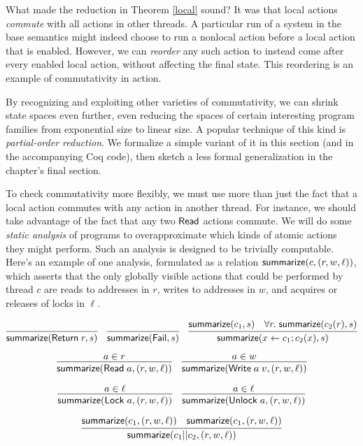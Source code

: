 \documentclass{amsbook}
\theoremstyle{definition}
\theoremstyle{remark}
\numberwithin{section}{chapter}
\numberwithin{equation}{chapter}
\begin{document}
What made the reduction in Theorem \ref{local} sound?
It was that local actions \emph{commute} with all actions in other threads.
A particular run of a system in the base semantics might indeed choose to run a nonlocal action before a local action that is enabled.
However, we can \emph{reorder} any such action to instead come after every enabled local action, without affecting the final state.
This reordering is an example of commutativity in action.

By recognizing and exploiting other varieties of commutativity, we can shrink state spaces even further, even reducing the spaces of certain interesting program families from exponential size to linear size.
A popular technique of this kind is \emph{partial-order reduction}.
We formalize a simple variant of it in this section (and in the accompanying Coq code), then sketch a less formal generalization in the chapter's final section.

\newcommand{\summ}[2]{\mt{summarize}(#1, #2)}

To check commutativity more flexibly, we must use more than just the fact that a local action commutes with any action in another thread.
For instance, we should take advantage of the fact that any two $\mathsf{Read}$ actions commute.
We will do some \emph{static analysis} of programs to overapproximate which kinds of atomic actions they might perform.
Such an analysis is designed to be trivially computable.
Here's an example of one analysis, formulated as a relation $\summ{c}{(r, w, \ell)}$, which asserts that the only globally visible actions that could be performed by thread $c$ are reads to addresses in $r$, writes to addresses in $w$, and acquires or releases of locks in $\ell$.

$$\infer{\summ{\mt{Return} \; r}{s}}{}
\quad \infer{\summ{\mt{Fail}}{s}}{}
\quad \infer{\summ{x \leftarrow c_1; c_2(x)}{s}}{
    \summ{c_1}{s}
    & \forall r. \; \summ{c_2(r)}{s}
}$$

$$\infer{\summ{\mt{Read} \; a}{(r, w, \ell)}}{
  a \in r
}
\quad \infer{\summ{\mt{Write} \; a \; v}{(r, w, \ell)}}{
  a \in w
}$$

$$\infer{\summ{\mt{Lock} \; a}{(r, w, \ell)}}{
  a \in \ell
}
\quad \infer{\summ{\mt{Unlock} \; a}{(r, w, \ell)}}{
  a \in \ell
}$$

$$\infer{\summ{c_1 || c_2}{(r, w, \ell)}}{
  \summ{c_1}{(r, w, \ell)}
  & \summ{c_1}{(r, w, \ell)}
}$$

\newcommand{\na}[1]{\mt{nextAction}(#1)}
\end{document}
